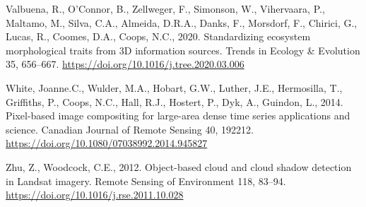 \documentclass[
]{agujournal2019}
\newlength{\cslhangindent}
\newenvironment{CSLReferences}[2] %
 {\begin{list}{}{%
  \setlength{\itemindent}{0pt}
  \setlength{\leftmargin}{0pt}
  \setlength{\parsep}{0pt}
  \ifodd #1
   \setlength{\leftmargin}{\cslhangindent}
   \setlength{\itemindent}{-1\cslhangindent}
  \fi
  \setlength{\itemsep}{#2\baselineskip}}}
 {\end{list}}
\begin{document}
\begin{CSLReferences}{1}{0}
Valbuena, R., O'Connor, B., Zellweger, F., Simonson, W., Vihervaara, P.,
Maltamo, M., Silva, C.A., Almeida, D.R.A., Danks, F., Morsdorf, F.,
Chirici, G., Lucas, R., Coomes, D.A., Coops, N.C., 2020. Standardizing
ecosystem morphological traits from 3D information sources. Trends in
Ecology \& Evolution 35, 656--667.
\url{https://doi.org/10.1016/j.tree.2020.03.006}

White, Joanne.C., Wulder, M.A., Hobart, G.W., Luther, J.E., Hermosilla,
T., Griffiths, P., Coops, N.C., Hall, R.J., Hostert, P., Dyk, A.,
Guindon, L., 2014. Pixel-based image compositing for large-area dense
time series applications and science. Canadian Journal of Remote Sensing
40, 192212. \url{https://doi.org/10.1080/07038992.2014.945827}

Zhu, Z., Woodcock, C.E., 2012. Object-based cloud and cloud shadow
detection in Landsat imagery. Remote Sensing of Environment 118, 83--94.
\url{https://doi.org/10.1016/j.rse.2011.10.028}

\end{CSLReferences}
\end{document}

